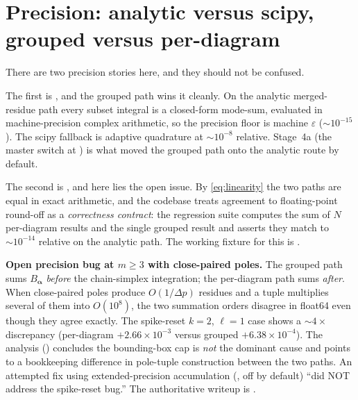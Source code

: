 \section{Precision: analytic versus scipy, grouped versus per-diagram}\label{sec:precision}

There are two precision stories here, and they should not be confused.

The first is , and the grouped path wins it cleanly.
On the analytic merged-residue path every subset integral is a closed-form
mode-sum, evaluated in machine-precision complex arithmetic, so the precision
floor is machine $\varepsilon$ ($\sim\!10^{-15}$). The scipy fallback is adaptive
quadrature at $\sim\!10^{-8}$ relative. Stage~4a (the master switch
 at )
is what moved the grouped path onto the analytic route by default.

The second is , and here lies the open issue. By
\eqref{eq:linearity} the two paths are equal in exact arithmetic, and the codebase
treats agreement to floating-point round-off as a \emph{correctness contract}: the
regression suite  computes the sum of $N$
per-diagram results and the single grouped result and asserts they match to
$\sim\!10^{-14}$ relative on the analytic path. The working fixture for this is
.

\begin{gotcha}
\textbf{Open precision bug at $m\ge 3$ with close-paired poles.} The grouped path
sums $B_{\bm\alpha}$ \emph{before} the chain-simplex integration; the per-diagram
path sums \emph{after}. When close-paired poles produce $O(1/\Delta p)$ residues
and a tuple multiplies several of them into $O(10^8)$, the two summation orders
disagree in float64 even though they agree exactly. The spike-reset $k=2$,
$\ell=1$ case shows a $\sim\!4\times$ discrepancy (per-diagram $+2.66\times10^{-3}$
versus grouped $+6.38\times10^{-4}$). The 
analysis () concludes the bounding-box cap is
\emph{not} the dominant cause and points to a bookkeeping difference in pole-tuple
construction between the two paths. An attempted fix using extended-precision
accumulation (, off by default) ``did NOT
address the spike-reset bug.'' The authoritative writeup is
.
\end{gotcha}

